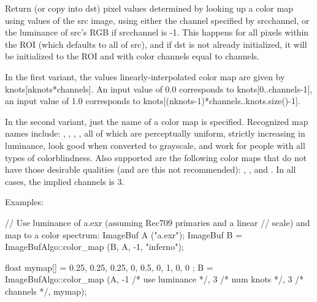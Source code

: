  

Return (or copy into {\cf dst}) pixel values determined by looking up a
color map using values of the {\cf src} image, using either the channel
specified by {\cf srcchannel}, or the luminance of {\cf src}'s RGB if {\cf
srcchannel} is -1. This happens for all pixels within the ROI (which
defaults to all of {\cf src}), and if {\cf dst} is not already initialized,
it will be initialized to the ROI and with color channels equal to {\cf channels}.

In the first variant, the values linearly-interpolated color map are
given by {\cf knots[nknots*channels]}.
An input value of 0.0 corresponds to {\cf knots[0..channels-1]}, an input
value of 1.0 corresponds to {\cf knots[(nknots-1)*channels..knots.size()-1]}.

In the second variant, just the name of a color map is specified. Recognized
map names include: , , , ,
all of which are perceptually uniform, strictly increasing in luminance,
look good when converted to grayscale, and work for people with all types of
colorblindness. Also supported are the following color maps that do not have
those desirable qualities (and are this not recommended): ,
, and . In all cases, the implied {\cf channels} is
3.

\smallskip
\noindent Examples:
\begin{code}
    // Use luminance of a.exr (assuming Rec709 primaries and a linear
    // scale) and map to a color spectrum:
    ImageBuf A ("a.exr");
    ImageBuf B = ImageBufAlgo::color_map (B, A, -1, "inferno");

    float mymap[] = { 0.25, 0.25, 0.25,  0, 0.5, 0,  1, 0, 0 };
    B = ImageBufAlgo::color_map (A, -1 /* use luminance */,
                                 3 /* num knots */, 3 /* channels */,
                                 mymap);
\end{code}

